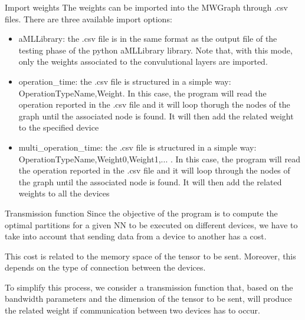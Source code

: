 \begin{frame}{Import weights}
    The weights can be imported into the MWGraph through .csv files. There are three available import options:
    \begin{itemize}
        \item aMLLibrary: the .csv file is in the same format as the output file of the testing phase of the python aMLLibrary library. Note that, with this mode, only the weights associated to the convulutional layers are imported. 
        \item operation\_time: the .csv file is structured in a simple way: OperationTypeName,Weight. In this case, the program will read the operation reported in the .csv file and it will loop thorugh the nodes of the graph until the associated node is found. It will then add the related weight to the specified device
        \item multi\_operation\_time: the .csv file is structured in a simple way: OperationTypeName,Weight0,Weight1,... . In this case, the program will read the operation reported in the .csv file and it will loop through the nodes of the graph until the associated node is found. It will then add the related weights to all the devices
    \end{itemize}
\end{frame}

\begin{frame}{Transmission function}
    Since the objective of the program is to compute the optimal partitions for a given NN to be executed on different devices, we have to take into account that sending data from a device to another has a cost. 
    
    This cost is related to the memory space of the tensor to be sent. Moreover, this depends on the type of connection between the devices. 
    
    To simplify this process, we consider a transmission function that, based on the bandwidth parameters and the dimension of the tensor to be sent, will produce the related weight if communication between two devices has to occur.
\end{frame}

